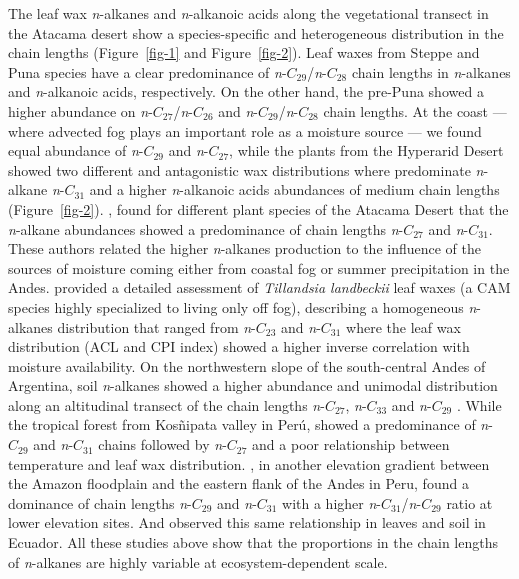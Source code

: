 \documentclass[
  authoryear,
  preprint,
  3p]{elsarticle}
\begin{document}
The leaf wax \emph{n}-alkanes and \emph{n}-alkanoic acids along the
vegetational transect in the Atacama desert show a species-specific and
heterogeneous distribution in the chain lengths (Figure~\ref{fig-1} and
Figure~\ref{fig-2}). Leaf waxes from Steppe and Puna species have a
clear predominance of \emph{n}-\(C_{29}\)/\emph{n}-\(C_{28}\) chain
lengths in \emph{n}-alkanes and \emph{n}-alkanoic acids, respectively.
On the other hand, the pre-Puna showed a higher abundance on
\emph{n}-\(C_{27}\)/\emph{n}-\(C_{26}\) and
\emph{n}-\(C_{29}\)/\emph{n}-\(C_{28}\) chain lengths. At the coast ---
where advected fog plays an important role as a moisture source --- we
found equal abundance of \emph{n}-\(C_{29}\) and \emph{n}-\(C_{27}\),
while the plants from the Hyperarid Desert showed two different and
antagonistic wax distributions where predominate \emph{n}-alkane
\emph{n}-\(C_{31}\) and a higher \emph{n}-alkanoic acids abundances of
medium chain lengths (Figure~\ref{fig-2}).
\citet{morchenFingerprintPlantLife2021}, found for different plant
species of the Atacama Desert that the \emph{n}-alkane abundances showed
a predominance of chain lengths \emph{n}-\(C_{27}\) and
\emph{n}-\(C_{31}\). These authors related the higher \emph{n}-alkanes
production to the influence of the sources of moisture coming either
from coastal fog or summer precipitation in the Andes.
\citet{contrerasLeafWaxComposition2022} provided a detailed assessment
of \emph{Tillandsia landbeckii} leaf waxes (a CAM species highly
specialized to living only off fog), describing a homogeneous
\emph{n}-alkanes distribution that ranged from \emph{n}-\(C_{23}\) and
\emph{n}-\(C_{31}\) where the leaf wax distribution (ACL and CPI index)
showed a higher inverse correlation with moisture availability. On the
northwestern slope of the south-central Andes of Argentina, soil
\emph{n}-alkanes showed a higher abundance and unimodal distribution
along an altitudinal transect of the chain lengths \emph{n}-\(C_{27}\),
\emph{n}-\(C_{33}\) and \emph{n}-\(C_{29}\)
\citep{nieto-morenoElevationdependentChangesNalkane2016}. While the
tropical forest from Kosñipata valley in Perú,
\citep{feakinsProductionLeafWax2016} showed a predominance of
\emph{n}-\(C_{29}\) and \emph{n}-\(C_{31}\) chains followed by
\emph{n}-\(C_{27}\) and a poor relationship between temperature and leaf
wax distribution. \citet{wuTropicalSoilProfiles2019}, in another
elevation gradient between the Amazon floodplain and the eastern flank
of the Andes in Peru, found a dominance of chain lengths
\emph{n}-\(C_{29}\) and \emph{n}-\(C_{31}\) with a higher
\emph{n}-\(C_{31}\)/\emph{n}-\(C_{29}\) ratio at lower elevation sites.
And \citet{teunissenvanmanenLeafSoilNalkane2020} observed this same
relationship in leaves and soil in Ecuador. All these studies above show
that the proportions in the chain lengths of \emph{n}-alkanes are highly
variable at ecosystem-dependent scale.
\end{document}
